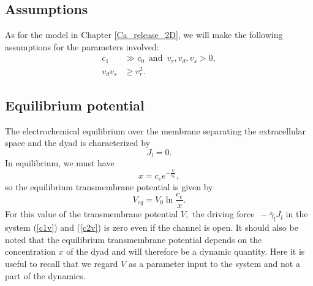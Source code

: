 \subsection{Assumptions}

As for the model in Chapter  \ref{Ca_release_2D}, we will make the following assumptions for the parameters involved:
\begin{align}
 c_{1}&\gg c_{0} \, \mbox{ and } \, v_r,v_d,v_s >0,  \label{assumption1V} \\
 v_{d}v_{s}&\ge v_{r}^{2}.  \label{assumption2V}
\end{align}

\begin{comment}
In the present model the transmembrane potential is a parameter and we will assume that it satisfies the condition 
\begin{equation}
V\leqslant V_{0}\ln\left(  \frac{v_{r}+v_{d}}{c_{1}v_{r}+c_{0}v_{d}}%
c_{e}\right). \label{cond_V_200}%
\end{equation}
With the parameters used in our computations (see Table \ref{tab:param2DV}),  this condition implies
that we consider transmembrane potentials satisfying the condition
\begin{equation}
V\leqslant39.87\text{mV.}\label{cond_V_201}%
\end{equation}
\end{comment}


\subsection{Equilibrium potential}

\bigskip The electrochemical equilibrium over the membrane separating the
extracellular space and the dyad is characterized by
\[
J_{l}=0.
\]
In equilibrium, we must have
\[
x=c_{e}e^{-\frac{V}{V_0}},%
\]
so the equilibrium transmembrane potential is given by
\begin{equation}
V_{eq}=V_0 \ln\frac{c_{e}}{x}\label{V_eq}.%
\end{equation}
For this value of the transmembrane potential $V,$ the driving force $\, -\bar{\gamma}_{l}J_{l}$ in the
system (\ref{c1v}) and (\ref{c2v}) is zero even if the channel is open. It
should also be noted that the equilibrium transmembrane potential depends on
the concentration $x$ of the dyad and will therefore be a dynamic quantity. Here it is useful to 
recall that we regard $V$ as a parameter input to the system and not a part of the dynamics.

